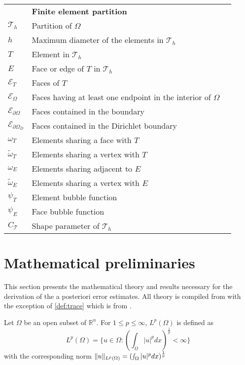 \begin{tabular}{lll}
    & \textbf{Finite element partition} & \\[3pt]
    $\mathcal{T}_h$   & Partition of $\Omega$ &\\[3pt]
    $h$   & Maximum diameter of the elements in $\mathcal{T}_h$ &\\[3pt]
    $T$   & Element in $\mathcal{T}_h$ &\\[3pt]
    $E$   & Face or edge of $T$ in $\mathcal{T}_h$ &\\[3pt]
    $\mathcal{E}_T$   & Faces of $T$ &\\[3pt]
    $\mathcal{E}_\Omega$   & Faces having at least one endpoint in the interior of $\Omega$ &\\[3pt]
    $\mathcal{E}_{\partial\Omega}$   & Faces contained in the boundary &\\[3pt]
     $\mathcal{E}_{\partial\Omega_D}$   & Faces contained in the Dirichlet boundary &\\[3pt]
    $\omega_T$   & Elements sharing a face with $T$ &\\[3pt]
    $\tilde{\omega}_T$  & Elements sharing a vertex with $T$ &\\[3pt]
    $\omega_E$   & Elements sharing adjacent to $E$ &\\[3pt]
    $\tilde{\omega}_E$  & Elements sharing a vertex with $E$ &\\[3pt]
	$\psi_T$  & Element bubble function &\\[3pt]
	$\psi_E$  & Face bubble function &\\[3pt]
    $C_{\mathcal{T}}$   & Shape parameter of $\mathcal{T}_h$ &\\[3pt]
 \end{tabular}

\section{Mathematical preliminaries}
\label{section:prelim}
This section presents the mathematical theory and results necessary for the derivation of the a posteriori error estimates. All theory is compiled from \cite{verfurth13} with the exception of \ref{def:trace} which is from \cite{riviere}.

\begin{definition}\label{def:LP_space}
Let $\Omega$ be an open subset of $\mathbb{R}^n$. For $1\leq p \leq \infty$, $L^p(\Omega)$ is defined as
\begin{equation}
L^p(\Omega) = \{u \in \Omega : (\int_\Omega |u|^p dx)^\frac{1}{p} < \infty\}
\end{equation}
with the corresponding norm $\|u\|_{L^p(\Omega)} = (\smallint_\Omega |u|^p dx)^\frac{1}{p}$
\end{definition}

